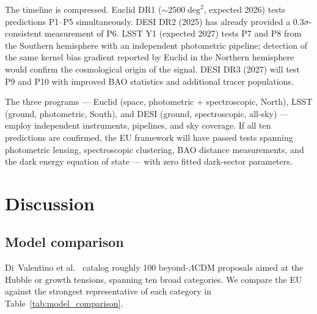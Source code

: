 \documentclass[a4paper,fleqn]{cas-dc}
\begin{document}
The timeline is compressed. Euclid DR1
($\sim\!2500\;\text{deg}^2$, expected 2026) tests
predictions P1--P5 simultaneously. DESI DR2 (2025) has
already provided a $0.3\sigma$-consistent measurement of
P6. LSST Y1 (expected 2027) tests P7 and P8 from the
Southern hemisphere with an independent photometric
pipeline; detection of the same kernel bias gradient
reported by Euclid in the Northern hemisphere would
confirm the cosmological origin of the signal. DESI
DR3 (2027) will test P9 and P10 with improved BAO
statistics and additional tracer populations.

The three programs --- Euclid (space, photometric +
spectroscopic, North), LSST (ground, photometric, South),
and DESI (ground, spectroscopic, all-sky) --- employ
independent instruments, pipelines, and sky coverage.
If all ten predictions are confirmed, the EU
framework will have passed tests spanning photometric
lensing, spectroscopic clustering, BAO distance
measurements, and the dark energy equation of state
--- with zero fitted dark-sector parameters.

\section{Discussion}
\label{sec:discussion}

\subsection{Model comparison}
\label{sec:model_comparison}

Di~Valentino et al.~\cite{divalentino2021} catalog roughly
100 beyond-$\Lambda$CDM proposals aimed at the Hubble or
growth tensions, spanning ten broad categories. We compare
the EU against the strongest representative of each
category in Table~\ref{tab:model_comparison}.
\end{document}
